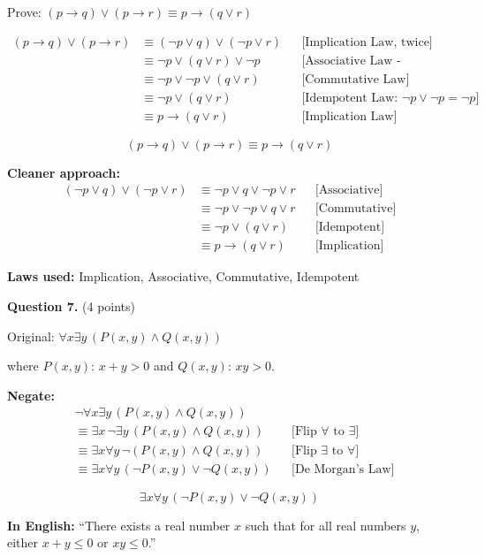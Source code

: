 \documentclass[11pt,a4paper]{article}
\begin{document}
\begin{solnbox}
Prove: $(p \to q) \lor (p \to r) \equiv p \to (q \lor r)$

\begin{align*}
(p \to q) \lor (p \to r) &\equiv (\neg p \lor q) \lor (\neg p \lor r) && \text{[Implication Law, twice]} \\
&\equiv \neg p \lor (q \lor r) \lor \neg p && \text{[Associative Law - rearranging]} \\
&\equiv \neg p \lor \neg p \lor (q \lor r) && \text{[Commutative Law]} \\
&\equiv \neg p \lor (q \lor r) && \text{[Idempotent Law: } \neg p \lor \neg p = \neg p\text{]} \\
&\equiv p \to (q \lor r) && \text{[Implication Law]}
\end{align*}

$$\boxed{(p \to q) \lor (p \to r) \equiv p \to (q \lor r)}$$

\textbf{Cleaner approach:}
\begin{align*}
(\neg p \lor q) \lor (\neg p \lor r) &\equiv \neg p \lor q \lor \neg p \lor r && \text{[Associative]} \\
&\equiv \neg p \lor \neg p \lor q \lor r && \text{[Commutative]} \\
&\equiv \neg p \lor (q \lor r) && \text{[Idempotent]} \\
&\equiv p \to (q \lor r) && \text{[Implication]}
\end{align*}

\textbf{Laws used:} Implication, Associative, Commutative, Idempotent
\end{solnbox}

\vspace{15pt}

\textbf{Question 7.} (4 points)

\begin{solnbox}
Original: $\forall x \exists y\, (P(x,y) \land Q(x,y))$

where $P(x,y)$: $x + y > 0$ and $Q(x,y)$: $xy > 0$.

\textbf{Negate:}
\begin{align*}
&\neg \forall x \exists y\, (P(x,y) \land Q(x,y)) \\
&\equiv \exists x\, \neg \exists y\, (P(x,y) \land Q(x,y)) && \text{[Flip } \forall \text{ to } \exists\text{]} \\
&\equiv \exists x \forall y\, \neg(P(x,y) \land Q(x,y)) && \text{[Flip } \exists \text{ to } \forall\text{]} \\
&\equiv \exists x \forall y\, (\neg P(x,y) \lor \neg Q(x,y)) && \text{[De Morgan's Law]}
\end{align*}

$$\boxed{\exists x \forall y\, (\neg P(x,y) \lor \neg Q(x,y))}$$

\textbf{In English:} ``There exists a real number $x$ such that for all real numbers $y$, either $x + y \leq 0$ or $xy \leq 0$.''
\end{solnbox}
\end{document}
